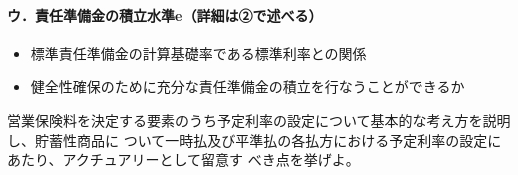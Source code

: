 \documentclass[report,gutter=10mm,fore-edge=10mm,uplatex,dvipdfmx]{jlreq}
\begin{document}
\paragraph{ウ．責任準備金の積立水準e（詳細は②で述べる）}
\begin{itemize}
 \item 標準責任準備金の計算基礎率である標準利率との関係
 \item 健全性確保のために充分な責任準備金の積立を行なうことができるか
\end{itemize}

営業保険料を決定する要素のうち予定利率の設定について基本的な考え方を説明し、貯蓄性商品に
ついて一時払及び平準払の各払方における予定利率の設定にあたり、アクチュアリーとして留意す
べき点を挙げよ。

\end{document}
